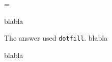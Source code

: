 \headline={\ifnum{}\firstheadline \else\otherheadline\fi}
\def\firstheadline{\tenrm\bf\hfil R\'ESUM\'E\hfil}
\def\otherheadline{\tenrm R\'esum\'e of A. U. Thor \leaders\hbox to 1ex{\hss.\hss}\hfill Page \folio}

blabla

\eject
The answer used {\tt dotfill}.
blabla

\eject

blabla

\bye

